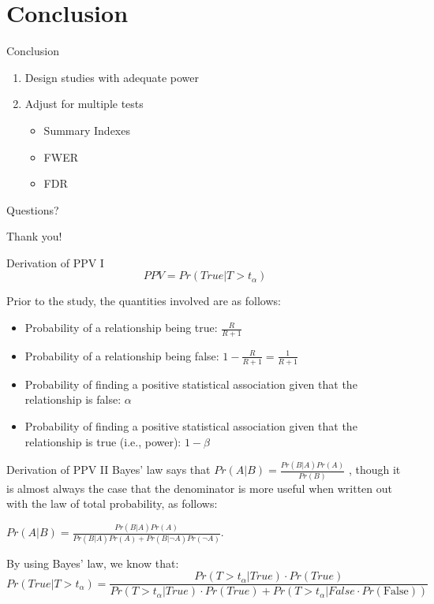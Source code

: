 \documentclass{beamer}
\begin{document}
\section{Conclusion}
\begin{frame}{Conclusion}
\begin{enumerate}
\item Design studies with adequate power
\item Adjust for multiple tests
\begin{itemize}
\item Summary Indexes
\item FWER
\item FDR
\end{itemize}
\end{enumerate}

\end{frame}

\begin{frame}
\begin{center}
Questions?
\vspace{1in}


\Huge{Thank you!}
\end{center}
\end{frame}



\begin{frame}[label=derive]{Derivation of PPV I}
\[PPV = Pr(True|T > t_{\alpha})\]

Prior to the study, the quantities involved are as follows:

\begin{itemize}
\item
  Probability of a relationship being true: \(\frac{R}{R + 1}\)
\item
  Probability of a relationship being false:
  \(1 - \frac{R}{R + 1} = \frac{1}{R + 1}\)
\item
  Probability of finding a positive statistical association given that
  the relationship is false: \(\alpha\)
\item
  Probability of finding a positive statistical association given that
  the relationship is true (i.e., power): \(1 - \beta\)
\end{itemize}
\end{frame}

\begin{frame}[label=derive]{Derivation of PPV II}
Bayes' law says that \(Pr(A|B) = \frac{Pr(B|A)Pr(A)}{Pr(B)}\) , though
it is almost always the case that the denominator is more useful when
written out with the law of total probability, as follows:

\(Pr(A|B) = \frac{Pr(B|A)Pr(A)}{Pr(B|A)Pr(A) + Pr(B|\neg A)Pr(\neg A)}\).

By using Bayes' law, we know that:
\tiny{
\[Pr(True|T > t_{\alpha}) = \frac{Pr(T > t_{\alpha}|True) \cdot Pr(True)}{Pr(T > t_{\alpha}|True) \cdot Pr(True) + Pr(T > t_{\alpha}|False \cdot Pr\left( \text{False} \right))}\]}
\end{frame}
\end{document}
